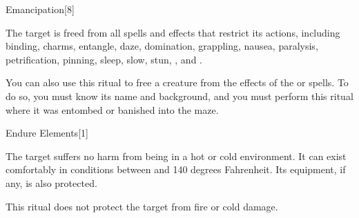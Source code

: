 \begin{spellsection}{Emancipation}[8]
    \begin{spellheader}
    \end{spellheader}
    \begin{spellcontent}
        \begin{spelltargetinginfo}
        \end{spelltargetinginfo}
        \begin{spelleffects}
            \spelleffect The target is freed from all spells and effects that restrict its actions, including binding, charms, entangle, daze, domination, grappling, nausea, paralysis, petrification, pinning, sleep, slow, stun, , and .

            \par You can also use this ritual to free a creature from the effects of the  or  spells. To do so, you must know its name and background, and you must perform this ritual where it was entombed or banished into the maze.
        \end{spelleffects}
    \end{spellcontent}
    \begin{spellfooter}
    \end{spellfooter}
\end{spellsection}

\begin{spellsection}{Endure Elements}[1]
    \begin{spellheader}
    \end{spellheader}
    \begin{spellcontent}
        \begin{spelltargetinginfo}
        \end{spelltargetinginfo}
        \begin{spelleffects}
            \spelleffect The target suffers no harm from being in a hot or cold environment. It can exist comfortably in conditions between  and 140 degrees Fahrenheit. Its equipment, if any, is also protected.
            \spelldur \durext
        \end{spelleffects}
    \end{spellcontent}
    \begin{spellfooter}
        \spellnotes This ritual does not protect the target from fire or cold damage.
    \end{spellfooter}
    \begin{spellaugments}
    \end{spellaugments}
\end{spellsection}

